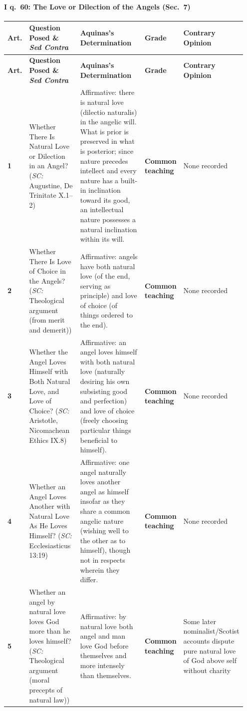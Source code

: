 \paragraph{I q.~60: The Love or Dilection of the Angels (Sec.~7)}
{\scriptsize
\setlength{\tabcolsep}{2.5pt}
\renewcommand{\arraystretch}{1.15}
\begin{longtable}{>{\raggedright\arraybackslash}p{0.05\linewidth}>{\raggedright\arraybackslash}p{0.23\linewidth}>{\raggedright\arraybackslash}p{0.31\linewidth}>{\raggedright\arraybackslash}p{0.12\linewidth}>{\raggedright\arraybackslash}p{0.24\linewidth}}
\toprule
\textbf{Art.} & \textbf{Question Posed \& \emph{Sed Contra}} & \textbf{Aquinas's Determination} & \textbf{Grade} & \textbf{Contrary Opinion} \\
\midrule
\endfirsthead
\toprule
\textbf{Art.} & \textbf{Question Posed \& \emph{Sed Contra}} & \textbf{Aquinas's Determination} & \textbf{Grade} & \textbf{Contrary Opinion} \\
\midrule
\endhead
\bottomrule
\endfoot
\textbf{1} & Whether There Is Natural Love or Dilection in an Angel? (\emph{SC:} Augustine, De Trinitate X.1--2) & Affirmative: there is natural love (dilectio naturalis) in the angelic will. What is prior is preserved in what is posterior; since nature precedes intellect and every nature has a built-in inclination toward its good, an intellectual nature possesses a natural inclination within its will. & \textbf{Common teaching} & None recorded \\
\addlinespace[1.5pt]
\textbf{2} & Whether There Is Love of Choice in the Angels? (\emph{SC:} Theological argument (from merit and demerit)) & Affirmative: angels have both natural love (of the end, serving as principle) and love of choice (of things ordered to the end). & \textbf{Common teaching} & None recorded \\
\addlinespace[1.5pt]
\textbf{3} & Whether the Angel Loves Himself with Both Natural Love, and Love of Choice? (\emph{SC:} Aristotle, Nicomachean Ethics IX.8) & Affirmative: an angel loves himself with both natural love (naturally desiring his own subsisting good and perfection) and love of choice (freely choosing particular things beneficial to himself). & \textbf{Common teaching} & None recorded \\
\addlinespace[1.5pt]
\textbf{4} & Whether an Angel Loves Another with Natural Love As He Loves Himself? (\emph{SC:} Ecclesiasticus 13:19) & Affirmative: one angel naturally loves another angel as himself insofar as they share a common angelic nature (wishing well to the other as to himself), though not in respects wherein they differ. & \textbf{Common teaching} & None recorded \\
\addlinespace[1.5pt]
\textbf{5} & Whether an angel by natural love loves God more than he loves himself? (\emph{SC:} Theological argument (moral precepts of natural law)) & Affirmative: by natural love both angel and man love God before themselves and more intensely than themselves. & \textbf{Common teaching} & Some later nominalist/Scotist accounts dispute pure natural love of God above self without charity \\
\end{longtable}
}

